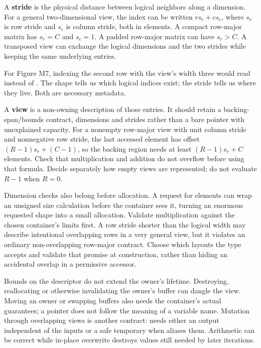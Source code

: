 \hypertarget{02-foundations-ii-ch038-runtime-views-borrow-a-layout-as-well-as-a-lifetime}{}

A \textbf{stride} is the physical distance between logical neighbors along a dimension. For a general two-dimensional view, the index can be written \(r s_r+c s_c\), where \(s_r\) is row stride and \(s_c\) is column stride, both in elements. A compact row-major matrix has \(s_r=C\) and \(s_c=1\). A padded row-major matrix can have \(s_r>C\). A transposed view can exchange the logical dimensions and the two strides while keeping the same underlying entries.

For Figure M7, indexing the second row with the view's width three would read  instead of . The shape tells us which logical indices exist; the stride tells us where they live. Both are necessary metadata.

A \textbf{view} is a non-owning description of those entries. It should retain a backing-span/bounds contract, dimensions and strides rather than a bare pointer with unexplained capacity. For a nonempty row-major view with unit column stride and nonnegative row stride, the last accessed element has offset \((R-1)s_r+(C-1)\), so the backing region needs at least \((R-1)s_r+C\) elements. Check that multiplication and addition do not overflow before using that formula. Decide separately how empty views are represented; do not evaluate \(R-1\) when \(R=0\).

Dimension checks also belong before allocation. A request for  elements can wrap an unsigned size calculation before the container sees it, turning an enormous requested shape into a small allocation. Validate multiplication against the chosen container's limits first. A row stride shorter than the logical width may describe intentional overlapping rows in a very general view, but it violates an ordinary non-overlapping row-major contract. Choose which layouts the type accepts and validate that promise at construction, rather than hiding an accidental overlap in a permissive accessor.

Bounds on the descriptor do not extend the owner's lifetime. Destroying, reallocating or otherwise invalidating the owner's buffer can dangle the view. Moving an owner or swapping buffers also needs the container's actual guarantees; a pointer does not follow the meaning of a variable name. Mutation through overlapping views is another contract:  needs either an output independent of the inputs or a safe temporary when  aliases them. Arithmetic can be correct while in-place overwrite destroys values still needed by later iterations.

